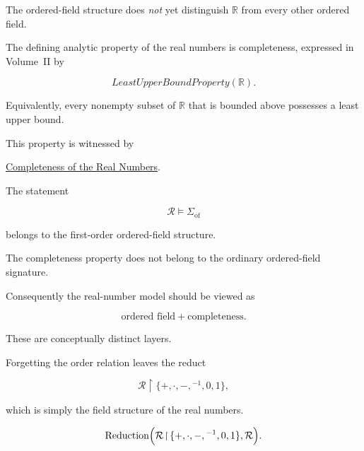 
\begin{remark*}

The ordered-field structure does \emph{not} yet distinguish
$\mathbb R$ from every other ordered field.

The defining analytic property of the real numbers is completeness, expressed
in Volume~II by

\[
LeastUpperBoundProperty(\mathbb R).
\]

Equivalently, every nonempty subset of $\mathbb R$ that is bounded above
possesses a least upper bound.

This property is witnessed by

\hyperref[ax:completeness-of-the-real-numbers]
{Completeness of the Real Numbers}.

\end{remark*}

\begin{remark*}

The statement

\[
\mathcal R
\models
\Sigma_{\mathrm{of}}
\]

belongs to the first-order ordered-field structure.

The completeness property does not belong to the ordinary ordered-field
signature.

Consequently the real-number model should be viewed as

\[
\text{ordered field}
+
\text{completeness}.
\]

These are conceptually distinct layers.

\end{remark*}


\begin{remark*}

Forgetting the order relation leaves the reduct

\[
\mathcal R
\!\restriction\!
\{+,\cdot,-,{}^{-1},0,1\},
\]

which is simply the field structure of the real numbers.

\[
\operatorname{Reduction}
\Bigl(
\mathcal R
\!\restriction\!
\{+,\cdot,-,{}^{-1},0,1\},
\mathcal R
\Bigr).
\]

\end{remark*}

